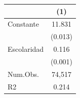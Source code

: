 \begin{table}
\centering
\begin{tabular}[t]{lc}
\toprule
  & (1)\\
\midrule
Constante & 11.831\\
 & (0.013)\\
Escolaridad & 0.116\\
 & (0.001)\\
\midrule
Num.Obs. & 74,517\\
R2 & 0.214\\
\bottomrule
\end{tabular}
\end{table}

